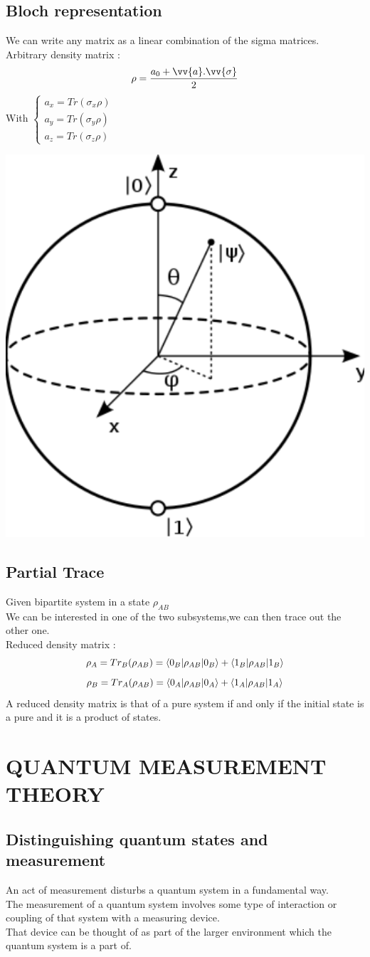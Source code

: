 \documentclass[12pt,oneside]{book}
\begin{document}
\section{Bloch representation}
We can write any matrix as a linear combination of the sigma matrices. \\
Arbitrary density matrix : 
\[\rho = \frac{a_0 + \vv{a}.\vv{\sigma}}{2}\]
With $\begin{cases}
    a_x = Tr(\sigma_x\rho)\\
    a_y = Tr(\sigma_y\rho)\\
    a_z = Tr(\sigma_z\rho)
\end{cases}$
\begin{center}
    \includegraphics[width=0.2\linewidth]{../pic/3327/1.png}
\end{center}
\section{Partial Trace}
    Given bipartite system in a state $\rho_{AB}$\\
    We can be interested in one of the two subsystems,we can then trace out the other one.\\
    Reduced density matrix :
    \[ \rho_A = Tr_B(\rho_{AB}) = \braket{0_B|\rho_{AB}|0_B} + \braket{1_B|\rho_{AB}|1_B} \]
    \[ \rho_B = Tr_A(\rho_{AB}) = \braket{0_A|\rho_{AB}|0_A} + \braket{1_A|\rho_{AB}|1_A} \]
    A reduced density matrix is that of a pure system if and only if the initial state is a pure and it is a product of states.
\chapter{QUANTUM MEASUREMENT THEORY}
\section{Distinguishing quantum states and measurement}
An act of measurement disturbs a quantum system in a fundamental way.\\
The measurement of a quantum system involves some type of interaction or coupling of that system with a measuring device.\\
That device can be thought of as part of the larger environment which the quantum system is a part of.\\
\end{document}
